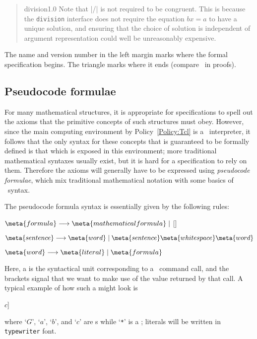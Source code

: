 \documentclass{mtmtcl}
\theoremstyle{plain}
\theoremstyle{remark}
\begin{document}
\begin{quote}
\begin{APIspec}{division}{1.0}
    Note that |/| is not required to be congruent. This is 
    because the \texttt{division} interface does not require the 
    equation \(bx=a\) to have a unique solution, and 
    ensuring that the choice of solution is independent of 
    argument representation could well be unreasonably expensive. 
  \end{APIspec}
\end{quote}
The name and version number in the left margin marks where the formal 
specification begins. The triangle marks where it ends (compare 
\qedsymbol\ in proofs).


\subsection{Pseudocode formulae}
\label{Ssec:Pseudokodsformler}

For many mathematical structures, it is appropriate for 
specifications to spell out the axioms that the primitive concepts of 
such structures must obey. However, since the main computing environment 
by Policy~\ref{Policy:Tcl} is a \Tcl\ interpreter, it follows that the 
only syntax for these concepts that is guaranteed to be formally defined 
is that which is exposed in this environment; more traditional 
mathematical syntaxes usually exist, but it is hard for a 
specification to rely on them. 
Therefore the axioms will generally have to be expressed using 
\emph{pseudocode formulae}, which mix traditional mathematical 
notation with some basics of \Tcl\ syntax.

The pseudocode formula syntax is essentially given by the following 
rules:
\begin{displaysyntax}
  \(\meta{formula} \longrightarrow \meta{mathematical formula} \mid 
  {}\)[]\par
  \(\meta{sentence} \longrightarrow \meta{word} \mid
  \meta{sentence}\meta{whitespace}\meta{word}\)\par
  \(\meta{word} \longrightarrow \meta{literal} \mid \meta{formula}\)
\end{displaysyntax}
Here, a  is the syntactical unit corresponding to a 
\Tcl\ command call, and the brackets signal that we want to make use 
of the value returned by that call. A typical example of how such a 
 might look is
\begin{displaysyntax}
  [$G$ * [$G$ * $a$ $b$] $c$]
\end{displaysyntax}
where `$G$', `$a$', `$b$', and `$c$' are s 
while `\texttt{*}' is a ; literals will be written in 
\texttt{typewriter} font.
\end{document}
